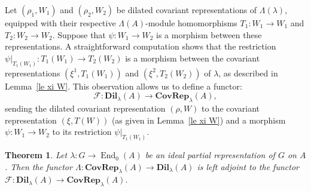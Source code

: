 \documentclass[11pt]{amsart}
\numberwithin{equation}{section}
\newtheorem{theorem}{Theorem}[section] %
\theoremstyle{definition}
\theoremstyle{remark}
\newcommand{\F}{\mathcal{F}}
\begin{document}
Let \((\rho_1, W_1)\) and \((\rho_2, W_2)\) be dilated covariant representations of \(\Lambda(\lambda)\),   equipped with their respective \(\Lambda(A)\)-module homomorphisms \(T_1: W_1 \to W_1\) and \(T_2: W_2 \to W_2\). Suppose  that  \(\psi: W_1 \to W_2\) is a morphism between these representations. A straightforward computation shows that the restriction \(\psi|_{T_1(W_1)}: T_1(W_1) \to T_2(W_2)\) is a morphism between the covariant representations \((\xi^1, T_1(W_1))\) and \((\xi^2, T_2(W_2))\) of \(\lambda\), as described in Lemma~\ref{le xi W}. This observation allows  us to define a functor:
\[
    \F: \textbf{Dil}_{\lambda}(A) \to \textbf{CovRep}_{\lambda}(A),
\]
sending the dilated covariant representation \((\rho, W)\) to the covariant representation \((\xi, T(W))\) (as given in Lemma~\ref{le xi W}) and a morphism \(\psi: W_1 \to W_2\) to its restriction \(\psi|_{T_1(W_1)}\).


\begin{theorem}
    Let \(\lambda: G \to \operatorname{End}_0(A)\) be  an ideal  partial representation  of \(G\) on \(A\). Then the functor 
    \(
    \Lambda: \textbf{CovRep}_{\lambda}(A) \to \textbf{Dil}_{\lambda}(A) 
    \)
    is left adjoint to the functor 
    \(
    \F: \textbf{Dil}_{\lambda}(A) \to \textbf{CovRep}_{\lambda}(A).
    \)
\end{theorem}
\end{document}

